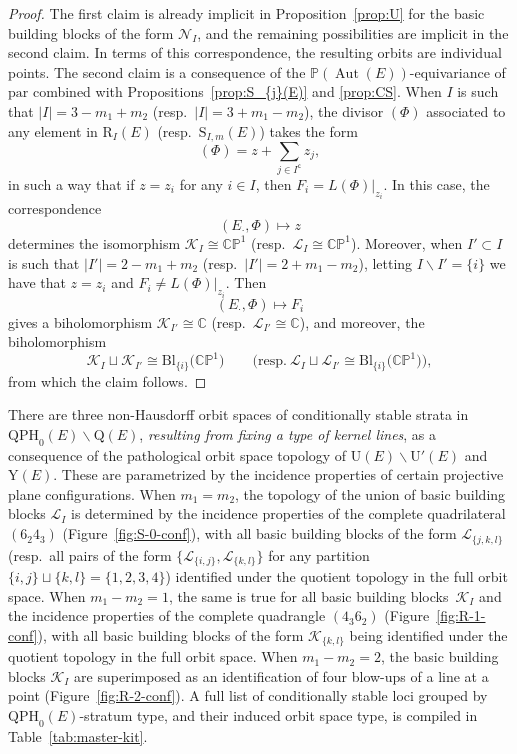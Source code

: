\documentclass[pdftex]{sigma}
\newcommand{\field}[1]{\ensuremath{\mathbb{#1}}}
\newcommand{\CC}{\field{C}}
\newcommand{\PP}{\field{P}}
\newcommand{\curly}[1]{\mathscr{#1}}
\newcommand{\cK}{\curly{K}}
\newcommand{\cL}{\curly{L}}
\newcommand{\cN}{\curly{N}}
\newcommand{\qp}{\boldsymbol{\cdot}}
\DeclareMathOperator{\Aut}{Aut}
\numberwithin{equation}{section}
\begin{document}
\begin{proof}
The first claim is already implicit in Proposition~\ref{prop:U} for the basic building blocks of the form $\cN_{I}$, and the remaining possibilities are implicit in the second claim. In terms of this correspondence, the resulting orbits are individual points.
The second claim is a consequence of the $\PP(\Aut(E))$-equivariance of $\mathrm{par}$ combined with Propositions~\ref{prop:S_{j}(E)} and \ref{prop:CS}. When $I$ is such that $\vert I\vert = 3 - m_{1} + m_{2}$ (resp.~$\vert I\vert = 3 + m_{1} - m_{2}$), the divisor $(\Phi)$ associated to any element in $\mathrm{R}_{I}(E)$ (resp.~$\mathrm{S}_{I,m}(E)$) takes the form
\[
(\Phi) = z+ \sum_{j\in I^{\mathsf{c}}} z_{j},
\]
in such a way that if $z=z_{i}$ for any $i\in I$, then $F_{i} = L(\Phi)\vert_{z_{i}}$. In this case, the correspondence
\[
(E_{\qp},\Phi)\mapsto z
\]
determines the isomorphism $\cK_{I}\cong\CC\PP^{1}$ (resp.~$\cL_{I}\cong \CC\PP^{1}$). Moreover, when $I'\subset I$ is such that $\vert I'\vert = 2 - m_{1} + m_{2}$ (resp.~$\vert I'\vert = 2 + m_{1} - m_{2}$), letting $I\backslash I' = \{i\}$ we have that $z =z_{i}$ and $F_{i} \neq L(\Phi)\vert_{z_{i}}$. Then
\[
(E_{\qp},\Phi)\mapsto F_{i}
\]
gives a biholomorphism $\cK_{I'}\cong\CC$ (resp.~$\cL_{I'}\cong \CC$), and moreover, the biholomorphism
\[
\cK_{I}\sqcup\cK_{I'}\cong\mathrm{Bl}_{\{i\}}\big(\CC\PP^{1}\big)\qquad \big(\text{resp.}\ \cL_{I}\sqcup\cL_{I'}\cong\mathrm{Bl}_{\{i\}}\big(\CC\PP^{1}\big)\big),
\]
from which the claim follows.
\end{proof}

There are three non-Hausdorff orbit spaces of conditionally stable strata in $\mathrm{QPH}_{0}(E)\backslash\mathrm{Q}(E)$, \textit{resulting from fixing a type of kernel lines}, as a consequence of the pathological orbit space topology of $\mathrm{U}(E)\backslash\mathrm{U}'(E)$ and $\mathrm{Y}(E)$. These are parametrized by the incidence properties of certain projective plane configurations.
When $m_{1} = m_{2}$, the topology of the union of basic building blocks $\cL_{I}$ is determined by the incidence properties of the complete quadrilateral $(6_{2}4_{3})$ (Figure~\ref{fig:S-0-conf}), with all basic building blocks of the form $\cL_{\{j,k,l\}}$ (resp.~all pairs of the form $\{\cL_{\{i,j\}},\cL_{\{k,l\}}\}$ for any partition $\{i,j\}\sqcup\{k,l\} = \{1,2,3,4\}$) identified under the quotient topology in the full orbit space. When $m_{1} - m_{2} = 1$, the same is true for all basic building blocks~$\cK_{I}$ and the incidence properties of the complete quadrangle $(4_{3}6_{2})$ (Figure~\ref{fig:R-1-conf}), with all basic building blocks of the form $\cK_{\{k,l\}}$ being identified under the quotient topology in the full orbit space. When $m_{1} - m_{2} = 2$, the basic building blocks $\cK_{I}$ are superimposed as an identification of four blow-ups of a line at a point (Figure~\ref{fig:R-2-conf}). A full list of conditionally stable loci grouped by $\mathrm{QPH}_{0}(E)$-stratum type, and their induced orbit space type, is compiled in
Table~\ref{tab:master-kit}.
\end{document}
